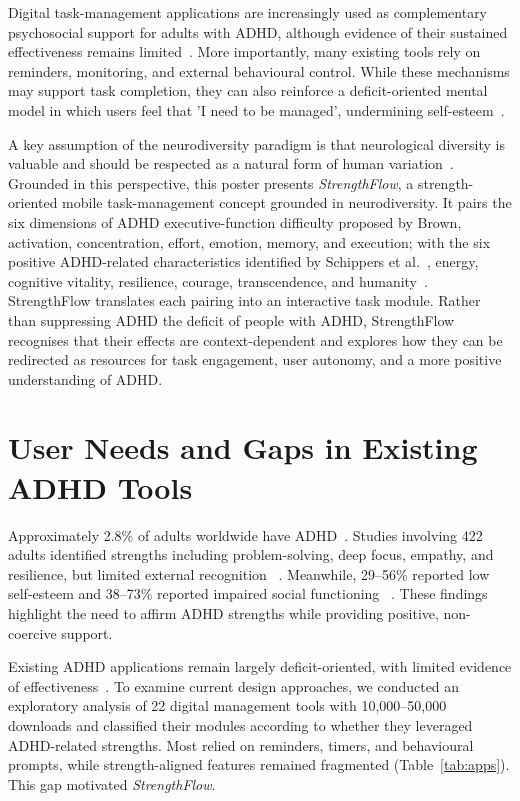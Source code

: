 \documentclass[manuscript,screen,review,anonymous]{acmart}
\begin{document}
Digital task-management applications are increasingly used as complementary psychosocial support for adults with ADHD, although evidence of their sustained effectiveness remains limited~\cite{pasarelu2020}. More importantly, many existing tools rely on reminders, monitoring, and external behavioural
control. While these mechanisms may support task completion, they can also reinforce a deficit-oriented mental model in which users feel that 'I need to be managed', undermining self-esteem\cite{torous2016}~\cite{gajecki2014}.

A key assumption of the neurodiversity paradigm is that neurological
diversity is valuable and should be respected as a natural form of human
variation~\cite{denhouting2019}. Grounded in this perspective, this poster presents \textit{StrengthFlow}, a strength-oriented mobile task-management concept grounded in neurodiversity. It pairs the six dimensions of ADHD executive-function difficulty proposed by
Brown\cite{nigg2005}, activation, concentration, effort, emotion, memory, and execution; with the six positive ADHD-related characteristics identified by Schippers et al.~\cite{sedgwick2019}, energy, cognitive vitality, resilience, courage, transcendence, and humanity~\cite{schippers2022}. StrengthFlow translates each pairing into an interactive task module. Rather than suppressing ADHD the deficit of people with ADHD, StrengthFlow recognises that their effects are context-dependent and explores how they can be redirected as resources for task engagement, user autonomy, and a more positive understanding of ADHD.


\section{User Needs and Gaps in Existing ADHD Tools}

Approximately 2.8\% of adults worldwide have ADHD~\cite{faraone2006}.
Studies involving 422 adults identified strengths including problem-solving, deep focus, empathy, and resilience, but limited external recognition
~\cite{sedgwick2019,schippers2022}. Meanwhile, 29--56\% reported low
self-esteem and 38--73\% reported impaired social functioning
~\cite{harpin2016}. These findings highlight the need to affirm ADHD strengths while providing positive, non-coercive support.

Existing ADHD applications remain largely deficit-oriented, with limited
evidence of effectiveness~\cite{pasarelu2020}. To examine current design approaches, we conducted an exploratory analysis of
22 digital management tools with 10,000--50,000 downloads and classified their modules according to whether they leveraged ADHD-related strengths. Most relied on reminders, timers, and behavioural prompts, while strength-aligned features remained fragmented
(Table~\ref{tab:apps}). This gap motivated \textit{StrengthFlow}.
\end{document}
